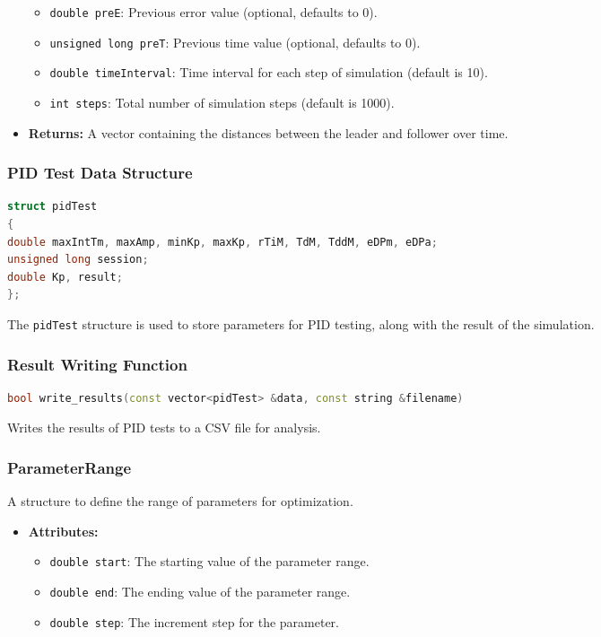 \documentclass[a4paper,12pt]{article}
\begin{document}
\begin{lstlising}[language=C++]
\begin{itemize}
\begin{itemize}
\item \texttt{double preE}: Previous error value (optional, defaults to 0).
\item \texttt{unsigned long preT}: Previous time value (optional, defaults to 0).
\item \texttt{double timeInterval}: Time interval for each step of simulation (default is 10).
\item \texttt{int steps}: Total number of simulation steps (default is 1000).
\end{itemize}
\item \textbf{Returns:} A vector containing the distances between the leader and follower over time.
\end{itemize}
\subsubsection{PID Test Data Structure}
\begin{lstlisting}[language=cpp]
struct pidTest
{
double maxIntTm, maxAmp, minKp, maxKp, rTiM, TdM, TddM, eDPm, eDPa;
unsigned long session;
double Kp, result;
};
\end{lstlisting}
The \texttt{pidTest} structure is used to store parameters for PID testing, along with the result of the simulation.
\subsubsection{Result Writing Function}
\begin{lstlisting}[language=cpp]
bool write_results(const vector<pidTest> &data, const string &filename)
\end{lstlisting}
Writes the results of PID tests to a CSV file for analysis.
\subsubsection{ParameterRange}
A structure to define the range of parameters for optimization.
\begin{itemize}
\item \textbf{Attributes:}
\begin{itemize}
\item \texttt{double start}: The starting value of the parameter range.
\item \texttt{double end}: The ending value of the parameter range.
\item \texttt{double step}: The increment step for the parameter.
\end{itemize}
\end{itemize}

\end{lstlising}
\end{document}
